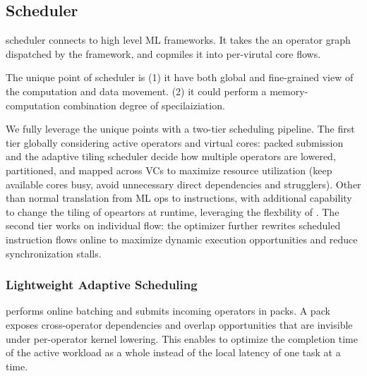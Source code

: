 \subsection{\sys{} Scheduler}
\label{sec:design-llm}

\sys{} scheduler connects \sys{} to high level ML frameworks.
It takes the an operator graph dispatched by the framework, and copmiles it into per-virutal core \sys{} \mop{} flows.


The unique point of \sys{} scheduler is
(1) it have both global and fine-grained view of the computation and data movement.
(2) it could perform a memory-computation combination degree of specilaiziation.

We fully leverage the unique points with a two-tier scheduling pipeline.
The first tier globally considering active operators and virtual cores: packed submission and the adaptive tiling scheduler decide how multiple operators are lowered, partitioned, and mapped across VCs to maximize resource utilization (keep available cores busy, avoid unnecessary direct dependencies and strugglers).
Other than normal translation from ML ops to \sys{} instructions,
with additional capability to change the tiling of opeartors at runtime, leveraging the flexbility of \sys{}.
The second tier works on individual \uop{} flow: the \mop{} optimizer further rewrites scheduled instruction flows online to maximize dynamic execution opportunities and reduce synchronization stalls.

\subsubsection{Lightweight Adaptive Scheduling}

\sys{} performs online batching and submits incoming operators in packs. A pack exposes cross-operator dependencies and overlap opportunities that are invisible under per-operator kernel lowering. This enables \sys{} to optimize the completion time of the active workload as a whole instead of the local latency of one task at a time.

